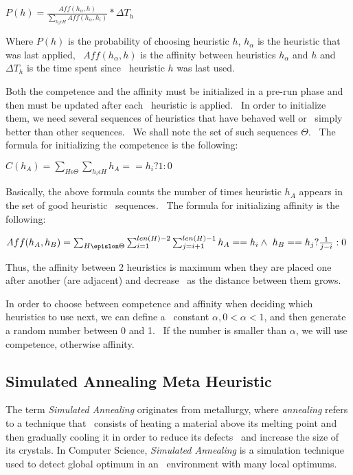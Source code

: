 \( P(h) = \frac{Aff(h_\alpha, h)}{\sum_{h_i \epsilon H} Aff(h_\alpha , h_i)} * \Delta T_h \)

Where $P(h)$ is the probability of choosing heuristic $h$, $h_\alpha$ is the heuristic that was last applied, \
$Aff(h_\alpha , h)$ is the affinity between heuristics $h_\alpha$ and $h$ and $\Delta T_h$ is the time spent since \
heuristic $h$ was last used.

Both the competence and the affinity must be initialized in a pre-run phase and then must be updated after each \
heuristic is applied. \
In order to initialize them, we need several sequences of heuristics that have behaved well or \
simply better than other sequences. \
We shall note the set of such sequences $\Theta$. \
The formula for initializing the competence is the following:

\( C(h_A) = \sum_{H \epsilon \Theta} \sum_{h_i \epsilon H} h_A == h_i ? 1 : 0 \)

Basically, the above formula counts the number of times heuristic $h_A$ appears in the set of good heuristic \
sequences. \
The formula for initializing affinity is the following:

\(  Aff(h_A, h_B) = \sum_{H \epislon \Theta} \sum_{i=1}^{len(H) - 2} \sum_{j=i+1}^{len(H) - 1} h_A == h_i \wedge \
h_B == h_j ? \frac{1}{j - i} : 0 \) %

Thus, the affinity between 2 heuristics is maximum when they are placed one after another (are adjacent) and decrease \
as the distance between them grows.

In order to choose between competence and affinity when deciding which heuristics to use next, we can define a \
constant $\alpha,  0 < \alpha < 1$, and then generate a random number between 0 and 1. \
If the number is smaller than $\alpha$, we will use competence, otherwise affinity. %


\subsection{Simulated Annealing Meta Heuristic}
\label{subsec:analysis-simulated-annealing}
The term \textit{Simulated Annealing} originates from metallurgy, where \textit{annealing} refers to a technique that \
consists of heating a material above its melting point and then gradually cooling it in order to reduce its defects \
and increase the size of its crystals.
In Computer Science, \textit{Simulated Annealing} is a simulation technique used to detect global optimum in an \
environment with many local optimums.


